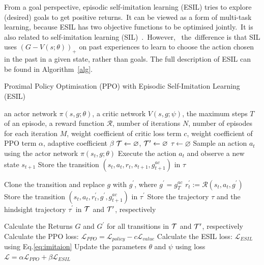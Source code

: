 From a goal perspective, episodic self-imitation learning (ESIL) tries to explore (desired) goals to get positive returns.~It can be viewed as a form of multi-task learning, {because ESIL has two objective functions to be optimised jointly.}~It is also related to self-imitation learning (SIL)~\cite{oh2018self}.~However,~ the~difference is that SIL uses $\left(G-V(s;\theta)\right)_{+}$ on past experiences to learn to choose the action chosen in the past in a given state, rather than goals. The full description of ESIL can be found in Algorithm~\ref{alg}.
\begin{algorithm}[t!]
  \caption{Proximal Policy Optimisation (PPO) with Episodic Self-Imitation Learning (ESIL)}
  \label{alg}
  \begin{algorithmic}[1]
    \REQUIRE an actor network $\pi(s, g;\theta)$, a critic network $V(s, g;\psi)$, the maximum steps $T$ of an episode, a reward function $\mathcal{R}$, number of iterations $N$, number of episodes for each iteration $M$, weight coefficient of critic loss term $c$, weight coefficient of PPO term $\alpha$, adaptive coefficient $\beta$  
    \STATE $\mathcal{T} \leftarrow \varnothing$, $\mathcal{T}^{\prime} \leftarrow \varnothing$ 
    \STATE $\tau \leftarrow \varnothing$
    \STATE Sample an action $a_{t}$ using the actor network $\pi(s_{t}, g;\theta)$
    \STATE Execute the action $a_{t}$ and observe a new state $s_{t+1}$
    \STATE Store the transition $\left(s_{t}, a_{t}, r_{t}, s_{t+1}, g^{ac}_{t+1}\right)$ in $\tau$
    \ENDFOR

    \STATE Clone the transition and replace $g$ with $g^{\prime}$, where $g^{\prime}=g^{ac}_{T}$
    \STATE $r_{t}^{\prime}:=\mathcal{R}\left(s_{t}, a_{t}, g^{\prime}\right)$
    \STATE Store the transition $\left(s_{t}, a_{t}, r_{t}^{\prime}, g^{\prime}, g^{ac}_{t+1}\right)$ in $\tau^{\prime}$
    \ENDFOR
    \STATE Store the trajectory $\tau$ and the hindsight trajectory $\tau^{\prime}$ in $\mathcal{T}$ and $\mathcal{T}^{\prime}$, respectively 
    \ENDFOR

    \STATE Calculate the Returns $G$ and $G^{\prime}$ for all transitions in $\mathcal{T}$ and $\mathcal{T}^{\prime}$, respectively
    \STATE Calculate the PPO loss: $\mathcal{L}_{PPO} = \mathcal{L}_{policy} - c\mathcal{L}_{value}$
    \STATE Calculate the ESIL loss: $\mathcal{L}_{ESIL}$ using Eq.\eqref{eq:imitaion}
    \STATE Update the parameters $\theta$ and $\psi$ using loss $\mathcal{L}=\alpha\mathcal{L}_{PPO} + \beta\mathcal{L}_{ESIL}$
    \ENDFOR 
\end{algorithmic}
\end{algorithm}


